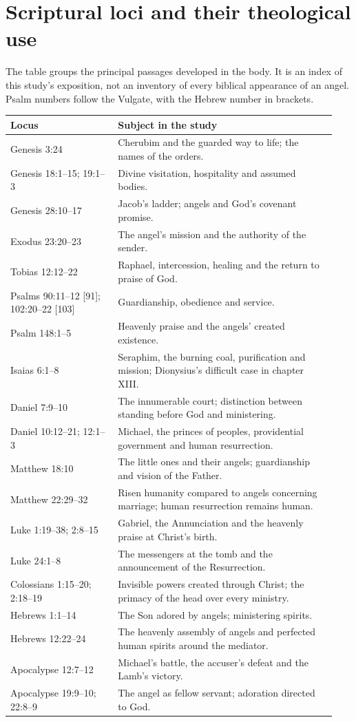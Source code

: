 \section{Scriptural loci and their theological use}
\label{app:scripture}

The table groups the principal passages developed in the body. It is an index
of this study's exposition, not an inventory of every biblical appearance of
an angel. Psalm numbers follow the Vulgate, with the Hebrew number in brackets.

\begin{longtable}{@{}>{\raggedright\arraybackslash}p{0.31\linewidth}>{\raggedright\arraybackslash}p{0.63\linewidth}@{}}
\toprule
Locus & Subject in the study\\
\midrule\endhead
Genesis 3:24 & Cherubim and the guarded way to life; the names of the orders.\\
Genesis 18:1--15; 19:1--3 & Divine visitation, hospitality and assumed bodies.\\
Genesis 28:10--17 & Jacob's ladder; angels and God's covenant promise.\\
Exodus 23:20--23 & The angel's mission and the authority of the sender.\\
Tobias 12:12--22 & Raphael, intercession, healing and the return to praise of God.\\
Psalms 90:11--12 [91]; 102:20--22 [103] & Guardianship, obedience and service.\\
Psalm 148:1--5 & Heavenly praise and the angels' created existence.\\
Isaias 6:1--8 & Seraphim, the burning coal, purification and mission;
Dionysius's difficult case in chapter XIII.\\
Daniel 7:9--10 & The innumerable court; distinction between standing before
God and ministering.\\
Daniel 10:12--21; 12:1--3 & Michael, the princes of peoples, providential
government and human resurrection.\\
Matthew 18:10 & The little ones and their angels; guardianship and vision
of the Father.\\
Matthew 22:29--32 & Risen humanity compared to angels concerning marriage;
human resurrection remains human.\\
Luke 1:19--38; 2:8--15 & Gabriel, the Annunciation and the heavenly praise
at Christ's birth.\\
Luke 24:1--8 & The messengers at the tomb and the announcement of the Resurrection.\\
Colossians 1:15--20; 2:18--19 & Invisible powers created through Christ;
the primacy of the head over every ministry.\\
Hebrews 1:1--14 & The Son adored by angels; ministering spirits.\\
Hebrews 12:22--24 & The heavenly assembly of angels and perfected human
spirits around the mediator.\\
Apocalypse 12:7--12 & Michael's battle, the accuser's defeat and the Lamb's victory.\\
Apocalypse 19:9--10; 22:8--9 & The angel as fellow servant; adoration directed to God.\\
\bottomrule
\end{longtable}

